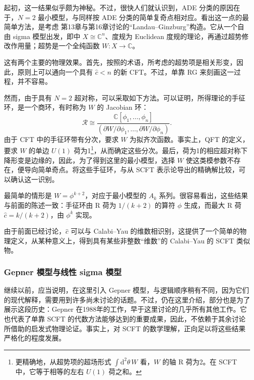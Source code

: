 起初，这一结果似乎颇为神秘。不过，很快人们就认识到，ADE 分类的原因在于，$N=2$ 最小模型，与同样按 ADE 分类的简单复奇点相对应。看出这一点的最简单方法，是考虑  第13章与第16章讨论的“Landau--Ginzburg”构造。它从一个自由 sigma 模型出发，即中 $X\cong\mathbb{C}^n$、度规为 Euclidean 度规的理论，再通过超势修改作用量；超势是一个全纯函数 $W\colon X\to\mathbb{C}$。

这有两个主要的物理效果。首先，按照的术语，所考虑的超势项是相关形变，因此，原则上可以通向一个具有 $\widehat c<n$ 的新 CFT。不过，单靠 RG 来刻画这一过程，并不容易。

然而，由于具有 $N=2$ 超对称，可以采取如下方法。可以证明，所得理论的手征环，是一个商环，有时称为 $W$ 的 Jacobian 环：
\[
\mathcal{R}\cong
\frac{\mathbb{C}[\phi_1,\ldots,\phi_n]}
{(\partial W/\partial\phi_1,\ldots,\partial W/\partial\phi_n)}.
\]
由于 CFT 中的手征环带有分次，要求 $W$ 为拟齐次函数。事实上，QFT 的定义，要求 $W$ 的单边 $U(1)$ 荷为1\footnote{更精确地，从超势项的超场形式 $\int\mathrm{d}^2\theta\,W$ 看，$W$ 的轴 R 荷为2。在 SCFT 中，它等于相等的左右 $U(1)$ 荷之和。}，从而确定这些分次。最后，荷为1的相应超对称下降形变是边缘的，因此，为了得到这里的最小模型，选择 $W$ 使这类模参数不存在，便导向简单奇点。将这些手征环，与从 SCFT 表示论导出的精确解比较，可以确认这一识别。

最简单的情形是 $W=\phi^{k+2}$，对应于最小模型的 $A_k$ 系列。很容易看出，这些结果与前面的陈述一致：手征环由 R 荷为 $1/(k+2)$ 的算符 $\phi$ 生成，而最大 R 荷 $\widehat c=k/(k+2)$，由 $\phi^k$ 实现。

由于前面已经讨论，$\widehat c$ 可以与 Calabi--Yau 的维数相识别，这提供了一个简单的物理定义，从某种意义上，得到具有某些非整数“维数”的 Calabi--Yau 的 SCFT 类似物。

\subsubsection{Gepner 模型与线性 sigma 模型}\label{sec:3.3.6.1}

继续以前，应当说明，在这里引入 Gepner 模型，与逻辑顺序稍有不同，因为它们的现代解释，需要用到许多尚未讨论的话题。不过，仍在这里介绍，部分也是为了展示这段历史：Gepner 在1988年的工作，早于这里讨论的几乎所有其他工作。它也代表了单靠 SCFT 的代数方法能够达到的重要成果，因此，不依赖于其余讨论所借助的启发式物理论证。事实上，对 SCFT 的数学理解，正向足以将这些结果严格化的程度发展。

